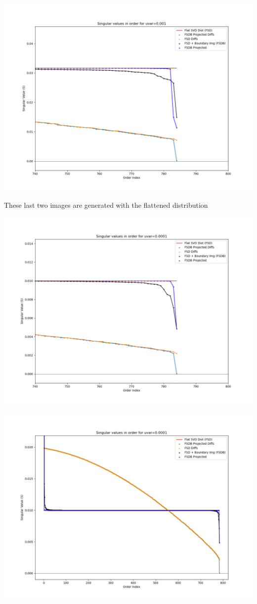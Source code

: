\documentclass[10pt]{extarticle}
\begin{document}
\includegraphics[width=14cm]{img/e05-SVD-uniform-rand_diff-decision_boundary_uvar-0.001-index-0-image-999-cropped.png}


These last two images are generated with the flattened distribution 

\includegraphics[width=14cm]{img/e06-SVD-uniform-rand_diff-decision_boundary_uvar-0.0001-index-0-image-999-cropped.png}

\includegraphics[width=14cm]{img/e06-SVD-uniform-rand_diff-decision_boundary_uvar-0.0001-index-0-image-999.png}
\end{document}
